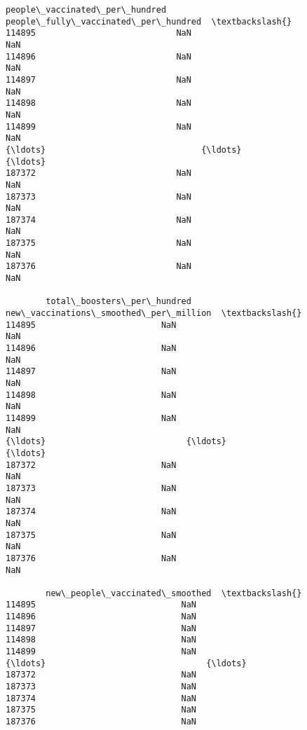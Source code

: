 \documentclass[11pt]{article}
\begin{document}
\begin{tcolorbox}[breakable, size=fbox, boxrule=.5pt, pad at break*=1mm, opacityfill=0]
\begin{Verbatim}[commandchars=\\\{\}]
        people\_vaccinated\_per\_hundred  people\_fully\_vaccinated\_per\_hundred  \textbackslash{}
114895                            NaN                                  NaN
114896                            NaN                                  NaN
114897                            NaN                                  NaN
114898                            NaN                                  NaN
114899                            NaN                                  NaN
{\ldots}                               {\ldots}                                  {\ldots}
187372                            NaN                                  NaN
187373                            NaN                                  NaN
187374                            NaN                                  NaN
187375                            NaN                                  NaN
187376                            NaN                                  NaN

        total\_boosters\_per\_hundred  new\_vaccinations\_smoothed\_per\_million  \textbackslash{}
114895                         NaN                                    NaN
114896                         NaN                                    NaN
114897                         NaN                                    NaN
114898                         NaN                                    NaN
114899                         NaN                                    NaN
{\ldots}                            {\ldots}                                    {\ldots}
187372                         NaN                                    NaN
187373                         NaN                                    NaN
187374                         NaN                                    NaN
187375                         NaN                                    NaN
187376                         NaN                                    NaN

        new\_people\_vaccinated\_smoothed  \textbackslash{}
114895                             NaN
114896                             NaN
114897                             NaN
114898                             NaN
114899                             NaN
{\ldots}                                {\ldots}
187372                             NaN
187373                             NaN
187374                             NaN
187375                             NaN
187376                             NaN


\end{Verbatim}
\end{tcolorbox}
\end{document}

